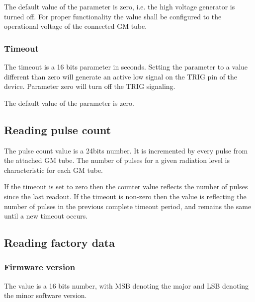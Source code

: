 \documentclass[a4paper]{article}
\begin{document}
{
The default value of the parameter is zero, i.e. the high voltage generator is turned off. For proper functionality the
value shall be configured to the operational voltage of the connected GM tube.}

\subsubsection[Timeout]{ Timeout}
\hypertarget{RefHeadingToc3561383566216}{}{
The timeout is a 16 bits parameter in seconds. Setting the parameter to a value different than zero will generate an
active low signal on the TRIG pin of the device. Parameter zero will turn off the TRIG signaling. }

{
The default value of the parameter is zero. }

\subsection[Reading pulse count]{ Reading pulse count}
\hypertarget{RefHeadingToc7033613373551}{}{
The pulse count value is a 24bits number. It is incremented by every pulse from the attached GM tube. The number of
pulses for a given radiation level is characteristic for each GM tube.}

{
If the timeout is set to zero then the counter value reflects the number of pulses since the last readout. If the
timeout is non-zero then the value is reflecting the number of pulses in the previous complete timeout period, and
remains the same until a new timeout occurs.}

\subsection[]{ }
\clearpage\subsection[Reading factory data]{ Reading factory data}
\hypertarget{RefHeadingToc7053613373551}{}\subsubsection[Firmware version]{ Firmware version}
\hypertarget{RefHeadingToc7073613373551}{}{
The value is a 16 bits number, with MSB denoting the major and LSB denoting the minor software version.}
\end{document}
